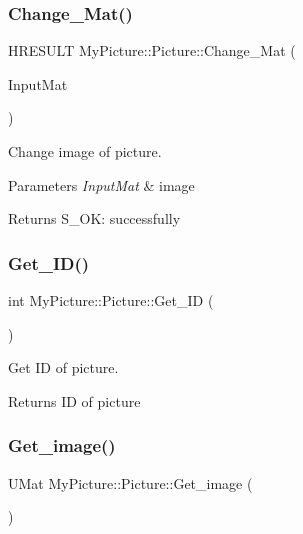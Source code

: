 \subsubsection{\texorpdfstring{Change\+\_\+\+Mat()}{Change\_Mat()}}
{\footnotesize\ttfamily H\+R\+E\+S\+U\+LT My\+Picture\+::\+Picture\+::\+Change\+\_\+\+Mat (\begin{DoxyParamCaption}\item[{U\+Mat}]{Input\+Mat }\end{DoxyParamCaption})\hspace{0.3cm}{\ttfamily [inline]}}



Change image of picture. 


\begin{DoxyParams}{Parameters}
{\em Input\+Mat} & image \\
\hline
\end{DoxyParams}
\begin{DoxyReturn}{Returns}
S\+\_\+\+OK\+: successfully 
\end{DoxyReturn}
\mbox{\label{class_my_picture_1_1_picture_a49cc1e556f631e0ef94f9451ae8fb52f}} 
\subsubsection{\texorpdfstring{Get\+\_\+\+I\+D()}{Get\_ID()}}
{\footnotesize\ttfamily int My\+Picture\+::\+Picture\+::\+Get\+\_\+\+ID (\begin{DoxyParamCaption}{ }\end{DoxyParamCaption})\hspace{0.3cm}{\ttfamily [inline]}}



Get ID of picture. 

\begin{DoxyReturn}{Returns}
ID of picture 
\end{DoxyReturn}
\mbox{\label{class_my_picture_1_1_picture_a16e67fa736ac4f7db5a07d728c1f24e5}} 
\subsubsection{\texorpdfstring{Get\+\_\+image()}{Get\_image()}}
{\footnotesize\ttfamily U\+Mat My\+Picture\+::\+Picture\+::\+Get\+\_\+image (\begin{DoxyParamCaption}{ }\end{DoxyParamCaption})\hspace{0.3cm}{\ttfamily [inline]}}



